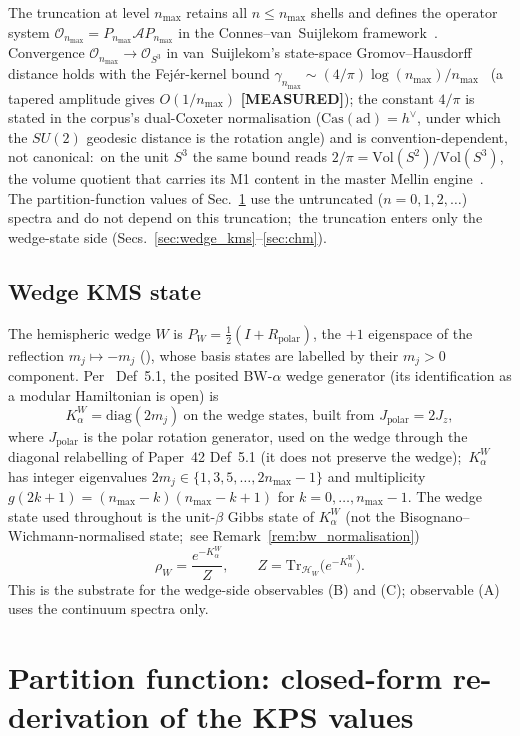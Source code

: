 \documentclass[11pt,a4paper]{article}
\theoremstyle{plain}
\theoremstyle{definition}
\newcommand{\nmax}{n_{\max}}
\newcommand{\sthree}{S^{3}}
\newcommand{\Hilb}{\mathcal{H}}
\newcommand{\Acal}{\mathcal{A}}
\newcommand{\Op}{\mathcal{O}}
\newcommand{\Tr}{\mathrm{Tr}}
\newcommand{\Kalpha}{K_{\alpha}^{W}}
\newcommand{\rhoW}{\rho_{W}}
\begin{document}
The truncation at level $\nmax$ retains all $n \le \nmax$ shells and
defines the operator system
$\Op_{\nmax} = P_{\nmax} \Acal P_{\nmax}$ in the
Connes--van~Suijlekom framework~\cite{connes_vs2021}. Convergence
$\Op_{\nmax} \to \Op_{\sthree}$ in van~Suijlekom's state-space
Gromov--Hausdorff distance holds with the Fej\'er-kernel bound $\gamma_{\nmax} \sim (4/\pi) \log(\nmax) /
\nmax$~\cite{paper38} (a tapered amplitude gives $O(1/\nmax)$ \textbf{[MEASURED]}); the constant $4/\pi$ is stated in the
corpus's dual-Coxeter normalisation ($\mathrm{Cas}(\mathrm{ad}) =
h^{\vee}$, under which the $SU(2)$ geodesic distance is
the rotation angle) and is convention-dependent, not canonical:\ on the unit
$\sthree$ the same bound reads $2/\pi = \mathrm{Vol}(S^{2})/\mathrm{Vol}(\sthree)$,
the volume quotient that carries its M1 content in the master Mellin
engine~\cite{paper18}.
The partition-function values of Sec.~\ref{sec:partition} use the
untruncated ($n = 0, 1, 2, \dots$) spectra and do not depend on this
truncation;\ the truncation enters only the wedge-state side
(Secs.~\ref{sec:wedge_kms}--\ref{sec:chm}).

\subsection{Wedge KMS state}

The hemispheric wedge $W$ is $P_W = \tfrac12(I + R_{\mathrm{polar}})$,
the $+1$ eigenspace of the reflection $m_j \mapsto -m_j$
(\cite{paper42}), whose basis states are labelled by their $m_j > 0$
component. Per~\cite{paper42} Def~5.1, the posited BW-$\alpha$
wedge generator (its identification as a modular Hamiltonian is open) is
\[
\Kalpha = \mathrm{diag}(2 m_j) \ \text{on the wedge states, built from } J_{\mathrm{polar}} = 2J_z,
\]
where $J_{\mathrm{polar}}$ is the polar rotation generator, used on the
wedge through the diagonal relabelling of Paper~42 Def~5.1 (it does not
preserve the wedge);\ $\Kalpha$ has integer eigenvalues $2m_{j} \in \{1, 3, 5, \dots,
2\nmax - 1\}$ and multiplicity $g(2k + 1) = (\nmax - k)(\nmax - k +
1)$ for $k = 0, \dots, \nmax - 1$. The wedge state used throughout is
the unit-$\beta$ Gibbs state of $\Kalpha$ (not the
Bisognano--Wichmann-normalised state;\ see
Remark~\ref{rem:bw_normalisation})
\[
\rhoW = \frac{e^{-\Kalpha}}{Z}, \qquad Z = \Tr_{\Hilb_{W}}\bigl(e^{-\Kalpha}\bigr).
\]
This is the substrate for the wedge-side observables (B) and (C);
observable (A) uses the continuum spectra only.

\section{Partition function: closed-form re-derivation of the KPS values}
\label{sec:partition}
\end{document}
